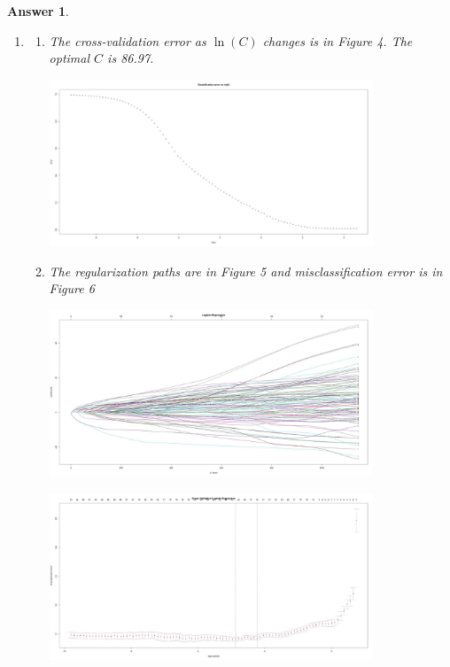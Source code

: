 \documentclass[12pt]{article}
\theoremstyle{colon}
\newtheorem*{answer}{Answer}
\begin{document}
\begin{answer}
\begin{enumerate}[label=\arabic*)]
    \item
      \begin{enumerate}[label=\arabic*)]
        \item The cross-validation error as $\ln(C)$ changes is in Figure 4. The optimal $C$ is 86.97.
          \begin{center}
            \includegraphics[width=0.8\textwidth]{svm_error.jpg}
          \end{center}

        \item The regularization paths are in Figure 5 and misclassification error is in Figure 6
          \begin{center}
            \includegraphics[width=0.8\textwidth]{glm_paths.jpg}
          \end{center}

          \begin{center}
            \includegraphics[width=0.8\textwidth]{cv_glm.jpg}
          \end{center}


\end{enumerate}
\end{enumerate}
\end{answer}
\end{document}
